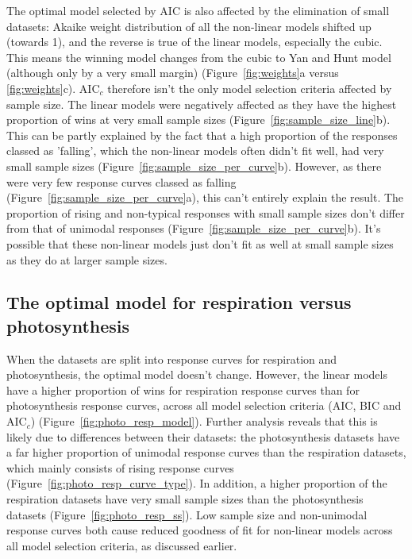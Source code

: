 \documentclass[11pt, a4paper]{article}
\begin{document}
The optimal model selected by AIC is also affected by the elimination of small datasets: Akaike weight distribution of all the non-linear models shifted up (towards 1), and the reverse is true of the linear models, especially the cubic. This means the winning model changes from the cubic to Yan and Hunt model (although only by a very small margin) (Figure~\ref{fig:weights}a versus \ref{fig:weights}c). AIC$_c$ therefore isn't the only model selection criteria affected by sample size. The linear models were negatively affected as they have the highest proportion of wins at very small sample sizes (Figure~\ref{fig:sample_size_line}b). This can be partly explained by the fact that a high proportion of the responses classed as 'falling', which the non-linear models often didn't fit well, had very small sample sizes (Figure~\ref{fig:sample_size_per_curve}b). However, as there were very few response curves classed as falling (Figure~\ref{fig:sample_size_per_curve}a), this can't entirely explain the result. The proportion of rising and non-typical responses with small sample sizes don't differ from that of unimodal responses (Figure~\ref{fig:sample_size_per_curve}b). It's possible that these non-linear models just don't fit as well at small sample sizes as they do at larger sample sizes.

\subsection{The optimal model for respiration versus photosynthesis}

When the datasets are split into response curves for respiration and photosynthesis, the optimal model doesn't change. However, the linear models have a higher proportion of wins for respiration response curves than for photosynthesis response curves, across all model selection criteria (AIC, BIC and AIC$_c$) (Figure~\ref{fig:photo_resp_model}). Further analysis reveals that this is likely due to differences between their datasets: the photosynthesis datasets have a far higher proportion of unimodal response curves than the respiration datasets, which mainly consists of rising response curves (Figure~\ref{fig:photo_resp_curve_type}). In addition, a higher proportion of the respiration datasets have very small sample sizes than the photosynthesis datasets (Figure~\ref{fig:photo_resp_ss}). Low sample size and non-unimodal response curves both cause reduced goodness of fit for non-linear models across all model selection criteria, as discussed earlier.
\end{document}
